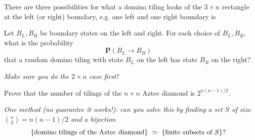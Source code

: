 \documentclass[11pt,fleqn]{book} %
\begin{document}
\begin{problem}
   There are three possibilities for what a domino tiling looks of the $3\times n$ rectangle at the left (or right) boundary, e.g. one left and one right boundary is

   \begin{center}
    \end{center}
Let $B_L,B_R$ be boundary states on the left and right. For each choice of $B_L,B_R$, what is the probability 
$$\mathbf{P}(B_L \to B_R)$$
that a random domino tiling with state $B_L$ on the left has state $B_R$ on the right? 

\textit{Make sure you do the $2\times n$ case first!}
\end{problem}

\begin{problem}
    Prove that the number of tilings of the $n\times n$ Aztec diamond is $2^{n(n-1)/2}$.

    \textit{One method (no guarantee it works!): can you solve this by finding a set $S$ of size $\binom{n}{2}= n(n-1)/2$ and a bijection 
    $$\{\textup{domino tilings of the Aztec diamond}\} \ \simeq \ \{\textup{finite subsets of $S$}\}?$$} 
\end{problem}
\end{document}
